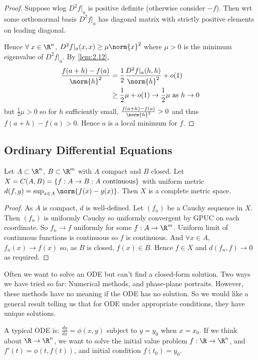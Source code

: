 \begin{proof}
    Suppose wlog $D^2f|_a$ is positive definite (otherwise consider $-f$).
    Then wrt some orthonormal basis $D^2f|_a$ has diagonal matrix with strictly positive elements on leading diagonal.

    Hence $\forall \; x \in \R^n$, $D^2f|_a(x,x) \ge \mu\norm{x}^2$ where $\mu > 0$ is the minimum eigenvalue of $D^2f|_a$.
    By \cref{lem:2.12},
    \begin{align*}
        \frac{f(a+h) - f(a)}{\norm{h}^2} &= \frac{1}{2} \frac{D^2f|_a(h,h)}{\norm{h}^2} + o(1)\\
        &\ge \frac{1}{2} \mu + o(1) \to \frac{1}{2} \mu \textup{ as } h\to 0
    \end{align*}
    but $\frac{1}{2}\mu > 0$ so for $h$ sufficiently small, $\frac{f(a+h) - f(a)}{\norm{h}^2}>0$ and thus $f(a+h) - f(a) > 0$.
    Hence $a$ is a local minimum for $f$.
\end{proof}

\subsection{Ordinary Differential Equations}
\begin{lemma} \label{lem:2.14}
    Let $A\subset\R^n$, $B\subset\R^m$ with $A$ compact and $B$ closed. Let $X = C(A,B) = \{f:A\to B : A \textup{ continuous}\}$ with uniform metric $d(f,g) = \sup_{x\in A} \norm{f(x)-g(x)}.$ Then $X$ is a complete metric space.
\end{lemma}

\begin{proof}
    As $A$ is compact, $d$ is well-defined.
    Let $(f_n)$ be a Cauchy sequence in $X$.
    Then $(f_n)$ is uniformly Cauchy so uniformly convergent by GPUC on each coordinate.
    So $f_n\to f$ uniformly for some $f: A \to \R^m$.
    Uniform limit of continuous functions is continuous so $f$ is continuous.
    And $\forall x \in A$, $f_n(x) \to f(x)$ so, as $B$ is closed, $f(x) \in B$.
    Hence $f \in X$ and $d(f_n,f) \to 0$ as required.
\end{proof}

Often we want to solve an ODE but can't find a closed-form solution. Two ways we have tried so far: Numerical methods, and phase-plane portraits. However, these methods have no meaning if the ODE has no solution. So we would like a general result telling us that for ODE under appropriate conditions, they have unique solutions.

A typical ODE is: $\frac{dy}{dx} = \phi(x,y)$ subject to $y=y_0$ when $x= x_0$. If we think about $\R\to\R^n$, we want to solve the initial value problem $f:\R\to\R^n$, and $f'(t) = \phi(t,f(t))$, and initial condition $f(t_0) = y_0$.

